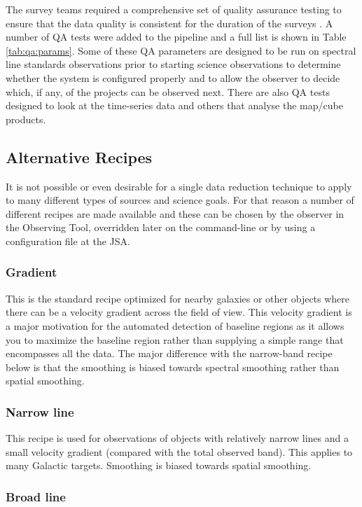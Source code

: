 \documentclass[final,authoryear,5p,times,twocolumn]{elsarticle}
\begin{document}
The survey teams required a comprehensive set of quality assurance
testing to ensure that the data quality is consistent for the duration
of the surveys \citep{2008JCMTLSQA}. A number of QA tests were added
to the pipeline and a full list is shown in Table
\ref{tab:qa:params}. Some of these QA parameters are designed to be
run on spectral line standards observations prior to starting science
observations to determine whether the system is configured properly
and to allow the observer to decide which, if any, of the projects can
be observed next. There are also QA tests designed to look at the
time-series data and others that analyse the map/cube products.

\subsection{Alternative Recipes}

It is not possible or even desirable for a single data reduction
technique to apply to many different types of sources and science
goals. For that reason a number of different recipes are made
available and these can be chosen by the observer in the Observing
Tool, overridden later on the command-line or by using a
configuration file at the JSA.

\subsubsection{Gradient}

This is the standard recipe optimized for nearby galaxies or other
objects where there can be a velocity gradient across
the field of view. This velocity gradient is a major motivation for the
automated detection of baseline regions as it allows you to maximize
the baseline region rather than supplying a simple range that
encompasses all the data. The major difference with the narrow-band
recipe below is that the smoothing is biased towards spectral smoothing
rather than spatial smoothing.

\subsubsection{Narrow line}

This recipe is used for observations of objects with relatively narrow
lines and a small velocity gradient (compared with the total observed
band). This applies to many Galactic targets. Smoothing is biased
towards spatial smoothing.

\subsubsection{Broad line}
\end{document}
